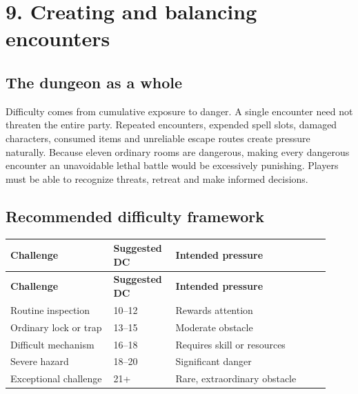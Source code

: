 \section{9. Creating and balancing encounters}

\subsection{The dungeon as a whole}

Difficulty comes from cumulative exposure to danger. A single encounter need not threaten the entire party. Repeated encounters, expended spell slots, damaged characters, consumed items and unreliable escape routes create pressure naturally. Because eleven ordinary rooms are dangerous, making every dangerous encounter an unavoidable lethal battle would be excessively punishing. Players must be able to recognize threats, retreat and make informed decisions.

\subsection{Recommended difficulty framework}

\begin{longtable}{p{0.3\linewidth}p{0.17\linewidth}p{0.45\linewidth}}

\rowcolor{tablehead} \textbf{Challenge} & \textbf{Suggested DC} & \textbf{Intended pressure} \\

\endfirsthead

\rowcolor{tablehead} \textbf{Challenge} & \textbf{Suggested DC} & \textbf{Intended pressure} \\

\endhead

Routine inspection & 10–12 & Rewards attention \\

Ordinary lock or trap & 13–15 & Moderate obstacle \\

Difficult mechanism & 16–18 & Requires skill or resources \\

Severe hazard & 18–20 & Significant danger \\

Exceptional challenge & 21+ & Rare, extraordinary obstacle \\

\end{longtable}

